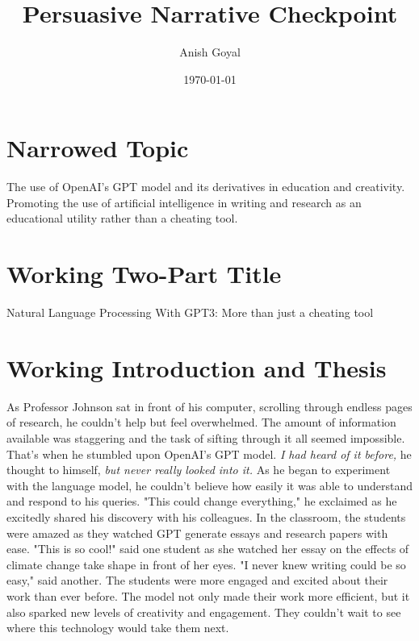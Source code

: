 \documentclass[man]{apa7}
\title{Persuasive Narrative Checkpoint}
\author{Anish Goyal}
\affiliation{Gwinnett School of Math\comma{} Science\comma{} and Technology}
\date{\today}
\begin{document}
\maketitle
\tableofcontents
\newpage
\section{Narrowed Topic}
\hspace{\parindent} The use of OpenAI's GPT model and its derivatives in education and creativity. Promoting the use of artificial intelligence in writing and research as an educational utility rather than a cheating tool.

\section{Working Two-Part Title}
\hspace{\parindent} Natural Language Processing With GPT3: More than just a cheating tool

\section{Working Introduction and Thesis}
\hspace{\parindent} As Professor Johnson sat in front of his computer, scrolling through endless pages of research, he couldn't help but feel overwhelmed. The amount of information available was staggering and the task of sifting through it all seemed impossible. That's when he stumbled upon OpenAI's GPT model. \emph{I had heard of it before,} he thought to himself, \emph{but never really looked into it.} As he began to experiment with the language model, he couldn't believe how easily it was able to understand and respond to his queries. "This could change everything," he exclaimed as he excitedly shared his discovery with his colleagues. In the classroom, the students were amazed as they watched GPT generate essays and research papers with ease. "This is so cool!" said one student as she watched her essay on the effects of climate change take shape in front of her eyes. "I never knew writing could be so easy," said another. The students were more engaged and excited about their work than ever before. The model not only made their work more efficient, but it also sparked new levels of creativity and engagement. They couldn't wait to see where this technology would take them next.
\newpage
\nocite{*}
\printbibliography
\end{document}
